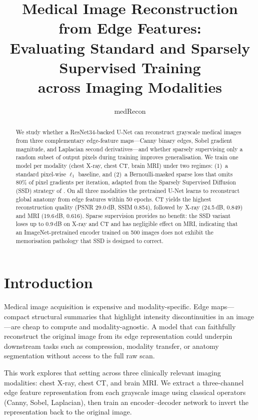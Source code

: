 \documentclass[10pt,twocolumn]{article}
\title{\textbf{Medical Image Reconstruction from Edge Features:\\
Evaluating Standard and Sparsely Supervised Training\\
across Imaging Modalities}}
\author{medRecon}
\date{}
\begin{document}
\maketitle

\begin{abstract}
We study whether a ResNet34-backed U-Net can reconstruct grayscale medical images
from three complementary edge-feature maps---Canny binary edges, Sobel gradient
magnitude, and Laplacian second derivatives---and whether sparsely supervising
only a random subset of output pixels during training improves generalisation.
We train one model per modality (chest X-ray, chest CT, brain MRI) under two
regimes: (1)~a standard pixel-wise $\ell_1$ baseline, and (2)~a Bernoulli-masked
sparse loss that omits 80\% of pixel gradients per iteration, adapted from the
Sparsely Supervised Diffusion (SSD) strategy of \cite{ssd2025}.
On all three modalities the pretrained U-Net learns to reconstruct global anatomy
from edge features within 50 epochs.
CT yields the highest reconstruction quality (PSNR 29.0\,dB, SSIM 0.854),
followed by X-ray (24.5\,dB, 0.849) and MRI (19.6\,dB, 0.616).
Sparse supervision provides no benefit: the SSD variant loses up to 0.9\,dB on
X-ray and CT and has negligible effect on MRI, indicating that an
ImageNet-pretrained encoder trained on 500 images does not exhibit the
memorisation pathology that SSD is designed to correct.
\end{abstract}

\section{Introduction}
\label{sec:intro}

Medical image acquisition is expensive and modality-specific.
Edge maps---compact structural summaries that highlight intensity discontinuities
in an image---are cheap to compute and modality-agnostic.
A model that can faithfully reconstruct the original image from its edge
representation could underpin downstream tasks such as compression, modality
transfer, or anatomy segmentation without access to the full raw scan.

This work explores that setting across three clinically relevant imaging
modalities: chest X-ray, chest CT, and brain MRI.
We extract a three-channel edge feature representation from each grayscale image
using classical operators (Canny, Sobel, Laplacian), then train an encoder--decoder
network to invert the representation back to the original image.
\end{document}
